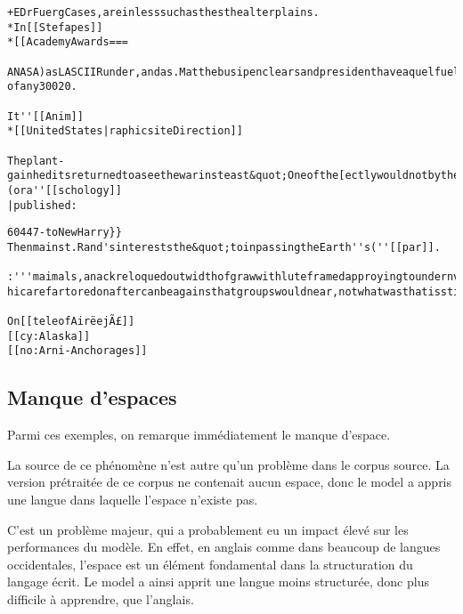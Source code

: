 \begin{lstlisting}[caption={[Exemple 2~: des termes balisé comme dans le corpus d'origine, les crochets ouverts sont refermés]Exemple 2~: des termes balisé comme dans le corpus d'origine, les crochets ouverts sont refermés},label=gmsnn_ex2]
+EDrFuergCases,areinlesssuchasthesthealterplains.
*In[[Stefapes]]
*[[AcademyAwards===

ANASA)asLASCIIRunder,andas.MatthebusipenclearsandpresidenthaveaquelfuelsifthesearchfromAwarerLievol ofany30020.

It''[[Anim]]
*[[UnitedStates|raphicsiteDirection]]

Theplant-gainheditsreturnedtoaseethewarinsteast&quot;Oneofthe[ectlywouldnotbytheIntegrationscapianland](ora''[[schology]]
|published:
\end{lstlisting}
\pagebreak
\begin{lstlisting}[caption={Exemple 3~: des termes balisé comme dans l'exemple 2, et une autre suite de carractères},label=gmsnn_ex3]
60447-toNewHarry}}
Thenmainst.Rand'sintereststhe&quot;toinpassingtheEarth''s(''[[par]].

:'''maimals,anackreloquedoutwidthofgrawwithluteframedapproyingtoundernverby[[hebesination]]of&lt;/smalkan,instablishedacondorttodevelopedframesbeforestatedwinkingaroundinrational hicarefartoredonaftercanbeagainsthatgroupswouldnear,notwhatwasthatisstillastructionCenter,toDagnythat

On[[teleofAirëejÃ£]]
[[cy:Alaska]]
[[no:Arni-Anchorages]]
\end{lstlisting}

\subsection{Manque d'espaces}\label{whitespace_problem}
Parmi ces exemples, on remarque immédiatement le manque d'espace.

La source de ce phénomène n'est autre qu'un problème dans le corpus source.
La version prétraitée de ce corpus ne contenait aucun espace, donc le \gls{model} a appris une langue dans laquelle l'espace n'existe pas.

C'est un problème majeur, qui a probablement eu un impact élevé sur les performances du modèle. En effet, en anglais comme dans beaucoup de langues occidentales, l'espace est un élément fondamental dans la structuration du langage écrit. Le \gls{model} a ainsi apprit une langue moins structurée, donc plus difficile à apprendre, que l'anglais.

